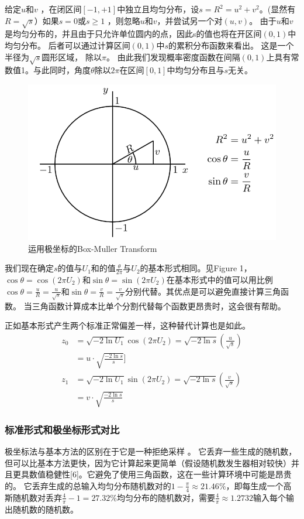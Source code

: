 \documentclass[twoside,twocolumn]{article}
\begin{document}
\begin{CJK*}{UTF8}{gkai}
	给定$u$和$v$ ，在闭区间$[-1,+1]$中独立且均匀分布，设$s=R^{2}=u^{2}+v^{2}$。(显然有$R=\sqrt{s}$）如果$s=0$或$s\geqslant1$ ，则忽略$u$和$v$，并尝试另一个对$(u,v)$。 由于$u$和$v$是均匀分布的，并且由于只允许单位圆内的点，因此s的值也将在开区间$(0,1)$中均匀分布。 后者可以通过计算区间$(0,1)$中$s$的累积分布函数来看出。 这是一个半径为$\sqrt{s}$圆形区域， 除以$\pi$。 由此我们发现概率密度函数在间隔$(0,1)$上具有常数值1。与此同时，角度$\theta$除以$2\pi$在区间$[0,1]$中均匀分布且与$s$无关。
	\begin{figure}[h]
		\centering
		\includegraphics[width=0.7\linewidth]{figure/800px-BoxMullerTransformUsingPolarCoordinates}
		\caption{运用极坐标的Box-Muller Transform}
		\label{fig:800px-BoxMullerTransformUsingPolarCoordinates}
	\end{figure}
	我们现在确定$s$的值与$U_{1}$和的值$\frac{\theta}{2\pi}$与$U_{2}$的基本形式相同。见Figure 1，$\cos\theta=\cos(2\pi U_{2})$和$\sin\theta=\sin(2\pi U_{2})$在基本形式中的值可以用比例$\cos\theta=\frac{u}{R}=\frac{u}{\sqrt{s}}$和$\sin\theta=\frac{v}{R}=\frac{v}{\sqrt{s}}$分别代替。其优点是可以避免直接计算三角函数。 当三角函数计算成本比单个分割代替每个函数更昂贵时，这会很有帮助。
	
	正如基本形式产生两个标准正常偏差一样，这种替代计算也是如此。
	\begin{equation*}
	\begin{aligned}
	z_{0}&={\sqrt {-2\ln U_{1}}}\cos(2\pi U_{2})={\sqrt {-2\ln s}}\left({\frac {u}{\sqrt {s}}}\right)\\
	&=u\cdot {\sqrt {\frac {-2\ln s}{s}}}]\\
	z_{1}&={\sqrt {-2\ln U_{1}}}\sin(2\pi U_{2})={\sqrt {-2\ln s}}\left({\frac {v}{\sqrt {s}}}\right)\\
	&=v\cdot {\sqrt {\frac {-2\ln s}{s}}}
	\end{aligned}
	\end{equation*}
\subsubsection{标准形式和极坐标形式对比}
	极坐标法与基本方法的区别在于它是一种拒绝采样 。 它丢弃一些生成的随机数，但可以比基本方法更快，因为它计算起来更简单（假设随机数发生器相对较快）并且更具数值稳健性[6]。它避免了使用三角函数，这在一些计算环境中可能是昂贵的。 它丢弃生成的总输入均匀分布随机数对的$1-\frac{\pi}{4}\approx21.46\%$，即每生成一个高斯随机数对丢弃$\frac{4}{\pi}-1=27.32\%$均匀分布的随机数对，需要$\frac{4}{\pi}\approx1.2732$输入每个输出随机数的随机数。
	

\end{CJK*}
\end{document}
